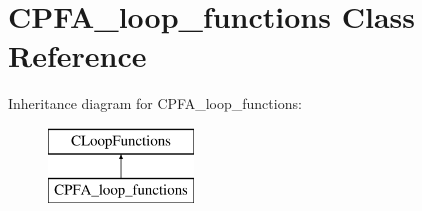 \hypertarget{class_c_p_f_a__loop__functions}{}\section{C\+P\+F\+A\+\_\+loop\+\_\+functions Class Reference}
\label{class_c_p_f_a__loop__functions}
Inheritance diagram for C\+P\+F\+A\+\_\+loop\+\_\+functions\+:\begin{figure}[H]
\begin{center}
\leavevmode
\includegraphics[height=2.000000cm]{class_c_p_f_a__loop__functions}
\end{center}
\end{figure}
